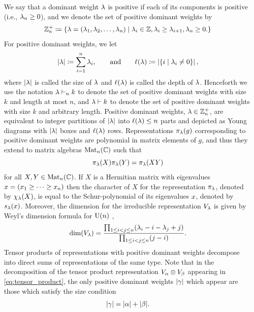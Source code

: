 \documentclass[notitlepage, 11pt, letterpaper]{amsart}
\begin{document}
We say that a dominant weight $\lambda$ is positive if each of its components is positive (i.e., $\lambda_n \geq 0$), and we denote the set of positive dominant weights by
\begin{equation}
    \mathbb Z^{+}_{n} \coloneqq \{ \lambda=(\lambda_1, \lambda_2, \ldots, \lambda_n) \mid \lambda_i \in \mathbb Z, \lambda_i \geq \lambda_{i+1}, \lambda_n \geq 0. \}
\end{equation}
For positive dominant weights, we let
\begin{equation}
    |\lambda| \coloneqq \sum_{i=1}^n \lambda_i,
    \qquad
    \text{and}
    \qquad
    \ell(\lambda) \coloneqq \left|\{i \mid \lambda_i \neq 0\}\right|,
\end{equation}
where $|\lambda|$ is called the size of $\lambda$ and $\ell(\lambda)$ is called the depth of $\lambda$.
Henceforth we use the notation $\lambda \vdash_{n} k$ to denote the set of positive dominant weights with size $k$ and length at most $n$, and $\lambda \vdash k$ to denote the set of positive dominant weights with size $k$ and arbitrary length.
Positive dominant weights, $\lambda \in \mathbb Z^{+}_{n}$, are equivalent to integer partitions of $|\lambda|$ into $\ell(\lambda) \leq n$ parts and depicted as Young diagrams with $|\lambda|$ boxes and $\ell(\lambda)$ rows.
Representations $\pi_\lambda(g)$ corresponding to positive dominant weights are polynomial in matrix elements of $g$, and thus they extend to matrix algebras $\operatorname{Mat}_n(\mathbb{C})$ such that
\begin{equation}
    \pi_\lambda(X) \pi_\lambda(Y) = \pi_\lambda(XY)
\end{equation}
for all $X,Y \in \operatorname{Mat}_n(\mathbb{C})$.
If $X$ is a Hermitian matrix with eigenvalues $x = (x_1 \geq \cdots \geq x_n)$ then the character of $X$ for the representation $\pi_{\lambda}$, denoted by $\chi_{\lambda}(X)$, is equal to the Schur-polynomial of its eigenvalues $x$, denoted by $s_{\lambda}(x)$.
Moreover, the dimension for the irreducible representation $V_{\lambda}$ is given by Weyl's dimension formula for $\operatorname{U}(n)$ \cite{hall2008representations,itzykson1966unitary},
\begin{equation}
    \label{eq:weyl_dim}
    \dim(V_{\lambda}) = \frac{\prod_{1 \leq i<j \leq n}(\lambda_i - i - \lambda_j + j)}{\prod_{1 \leq i<j \leq n}(j-i)}.
\end{equation}
Tensor products of representations with positive dominant weights decompose into direct sums of representations of the same type.
Note that in the decomposition of the tensor product representation $V_{\alpha}\otimes V_{\beta}$ appearing in \cref{eq:tensor_product}, the only positive dominant weights $|\gamma|$ which appear are those which satisfy the size condition
\begin{equation}
    \label{eq:size_condition_tri}
    |\gamma| = |\alpha| + |\beta|.
\end{equation}
\end{document}
